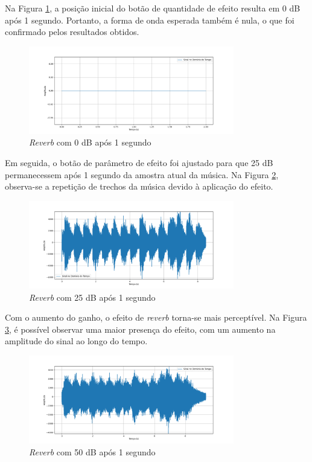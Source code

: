 Na Figura \ref{fig70}, a posição inicial do botão de quantidade de efeito resulta em 0 dB após 1 segundo. Portanto, a forma de onda esperada também é nula, o que foi confirmado pelos resultados obtidos.

\begin{figure}[h]
    \centering
    \includegraphics[width=0.8\textwidth]{figuras/fig70.png}
    \caption{\textit{Reverb} com 0 dB após 1 segundo}
    \label{fig70}
\end{figure}

Em seguida, o botão de parâmetro de efeito foi ajustado para que 25 dB permanecessem após 1 segundo da amostra atual da música. Na Figura \ref{fig71}, observa-se a repetição de trechos da música devido à aplicação do efeito.

\begin{figure}[h]
    \centering
    \includegraphics[width=0.8\textwidth]{figuras/fig71.png}
    \caption{\textit{Reverb} com 25 dB após 1 segundo}
    \label{fig71}
\end{figure}

Com o aumento do ganho, o efeito de \textit{reverb} torna-se mais perceptível. Na Figura \ref{fig72}, é possível observar uma maior presença do efeito, com um aumento na amplitude do sinal ao longo do tempo.

\begin{figure}[h]
    \centering
    \includegraphics[width=0.8\textwidth]{figuras/fig72.png}
    \caption{\textit{Reverb} com 50 dB após 1 segundo}
    \label{fig72}
\end{figure}


